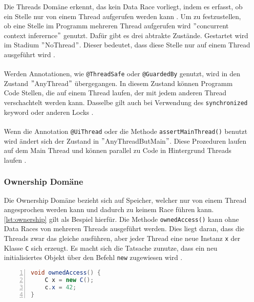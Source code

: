 Die Threads Domäne erkennt, das kein Data Race vorliegt, indem es erfasst, ob ein Stelle nur von einem Thread aufgerufen werden kann \cite[vgl.][8]{racerd}. Um zu festzustellen, ob eine Stelle im Programm mehreren Thread aufgerufen wird $"$concurrent context inferernce$"$ \cite[9]{racerd} genutzt. Dafür gibt es drei abtrakte Zustände.
Gestartet wird im Stadium $"$NoThread$"$. Dieser bedeutet, dass diese Stelle nur auf einem Thread ausgeführt wird \cite[vgl.][9-10]{racerd}.\\
\\
Werden Annotationen, wie \texttt{@ThreadSafe} oder \texttt{@GuardedBy} genutzt, wird in den Zustand $"$AnyThread$"$ übergegangen. In diesem Zustand können Programm Code Stellen, die auf einem Thread laufen, der mit jedem anderen Thread verschachtelt werden kann. Dasselbe gilt auch bei Verwendung des \texttt{synchronized} keyword oder anderen Locks \cite[vgl.][10]{racerd}.\\
\\
Wenn die Annotation \texttt{@UiThread} oder die Methode \texttt{assertMainThread()} benutzt wird ändert sich der Zustand in $"$AnyThreadButMain$"$. Diese Prozeduren laufen auf dem Main Thread und können parallel zu Code in Hintergrund Threads laufen \cite[vgl.][10]{racerd}.

\subsubsection*{Ownership Domäne}

Die Ownership Domäne bezieht sich auf Speicher, welcher nur von einem Thread angesprochen werden kann und dadurch zu keinem Race führen kann. \ref{lst:ownership} gilt als Bespiel hierfür. Die Methode \texttt{ownedAccess()} kann ohne Data Races von mehreren Threads ausgeführt werden. Dies liegt daran, dass die Threads zwar das gleiche ausführen, aber jeder Thread eine neue Instanz \texttt{x} der Klasse \texttt{C} sich erzeugt. Es macht sich die Tatsache zunutze, dass ein neu initialisiertes Objekt über den Befehl \texttt{new} zugewiesen wird \cite[vgl.][10]{racerd}. \\

\begin{lstlisting}[language=Java,frame=tb,caption={Ownership Domäne \cite{racerd}}, label={lst:ownership}, numbers=left, stepnumber=1, captionpos=b, tabsize=4]
void ownedAccess() {
	C x = new C();
	c.x = 42;
}
\end{lstlisting}

